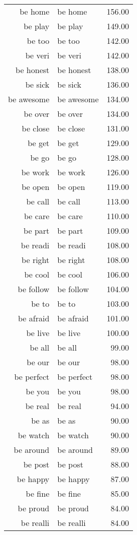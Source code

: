 \begin{table}[ht]
\begin{tabular}{rlr}
  be home & be home & 156.00 \\ 
  be play & be play & 149.00 \\ 
  be too & be too & 142.00 \\ 
  be veri & be veri & 142.00 \\ 
  be honest & be honest & 138.00 \\ 
  be sick & be sick & 136.00 \\ 
  be awesome & be awesome & 134.00 \\ 
  be over & be over & 134.00 \\ 
  be close & be close & 131.00 \\ 
  be get & be get & 129.00 \\ 
  be go & be go & 128.00 \\ 
  be work & be work & 126.00 \\ 
  be open & be open & 119.00 \\ 
  be call & be call & 113.00 \\ 
  be care & be care & 110.00 \\ 
  be part & be part & 109.00 \\ 
  be readi & be readi & 108.00 \\ 
  be right & be right & 108.00 \\ 
  be cool & be cool & 106.00 \\ 
  be follow & be follow & 104.00 \\ 
  be to & be to & 103.00 \\ 
  be afraid & be afraid & 101.00 \\ 
  be live & be live & 100.00 \\ 
  be all & be all & 99.00 \\ 
  be our & be our & 98.00 \\ 
  be perfect & be perfect & 98.00 \\ 
  be you & be you & 98.00 \\ 
  be real & be real & 94.00 \\ 
  be as & be as & 90.00 \\ 
  be watch & be watch & 90.00 \\ 
  be around & be around & 89.00 \\ 
  be post & be post & 88.00 \\ 
  be happy & be happy & 87.00 \\ 
  be fine & be fine & 85.00 \\ 
  be proud & be proud & 84.00 \\ 
  be realli & be realli & 84.00 \\ 

\end{tabular}
\end{table}
